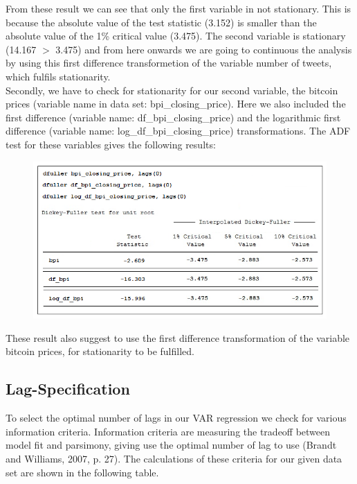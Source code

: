 \documentclass[a4paper,american,12pt]{article}
\begin{document}
\begin{spacing}{1.2}
From these result we can see that only the first variable in not stationary. This is because the absolute value of the test statistic (3.152) is smaller than the absolute value of the 1\% critical value (3.475). The second variable is stationary (14.167 $>$ 3.475) and from here onwards we are going to continuous the analysis by using this first difference transformetion of the variable number of tweets, which fulfils stationarity.\\

Secondly, we have to check for stationarity for our second variable, the bitcoin prices (variable name in data set: bpi\_closing\_price). Here we also included the first difference (variable name: df\_bpi\_closing\_price) and the logarithmic first difference (variable name: log\_df\_bpi\_closing\_price) transformations. The ADF test for these variables gives the following results:\\

\begin{figure}[H]
\centering
\graphicspath{ {stata_export_graphs/} }
\includegraphics[scale=0.85]{ADF_bpi_variables.png}
\end{figure}
	
These result also suggest to use the first difference transformation of the variable bitcoin prices, for stationarity to be fulfilled.

\subsection{Lag-Specification}
To select the optimal number of lags in our VAR regression we check for various information criteria. Information criteria are measuring the tradeoff between model fit and parsimony, giving use the optimal number of lag to use (Brandt and Williams, 2007, p. 27). The calculations of these criteria for our given data set are shown in the following table.\\


\end{spacing}
\end{document}
